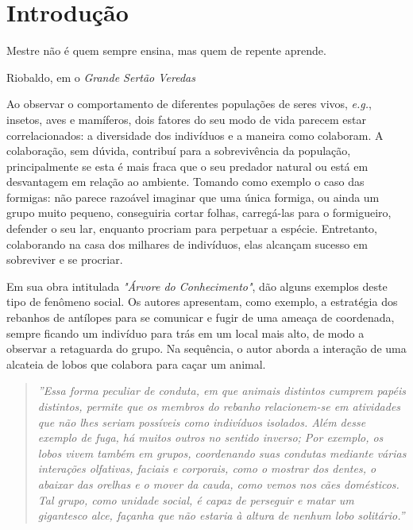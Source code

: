
\chapter{Introdução}
\label{chap:introducao}

\epigraph{Mestre não é quem sempre ensina, mas quem de repente aprende.}{Riobaldo, em o \textit{Grande Sertão Veredas}}

Ao observar o comportamento de diferentes populações de seres vivos, \textit{e.g.}, insetos, aves e mamíferos, dois fatores do seu modo de vida parecem estar correlacionados: a diversidade dos indivíduos e a maneira como colaboram. A colaboração, sem dúvida, contribuí para a sobrevivência da população, principalmente se esta é mais fraca que o seu predador natural ou está em desvantagem em relação ao ambiente. Tomando como exemplo o caso das formigas: não parece razoável imaginar que uma única formiga, ou ainda um grupo muito pequeno, conseguiria cortar folhas, carregá-las para o formigueiro, defender o seu lar, enquanto procriam para perpetuar a espécie. Entretanto, colaborando na casa dos milhares de indivíduos, elas alcançam sucesso em sobreviver e se procriar.

Em sua obra intitulada \textit{"Árvore do Conhecimento"},  dão alguns exemplos deste tipo de  fenômeno social. Os autores apresentam, como exemplo, a estratégia dos rebanhos de antílopes para se comunicar e fugir de uma ameaça de coordenada, sempre ficando um indivíduo para trás em um local mais alto, de modo a observar a retaguarda do grupo. Na sequência, o autor aborda a interação de uma alcateia de lobos que colabora para caçar um animal.

\begin{quote}
\textit{''Essa forma peculiar de conduta, em que animais distintos cumprem papéis distintos, permite que os membros do rebanho relacionem-se em atividades que não lhes seriam possíveis como indivíduos isolados. Além desse exemplo de fuga, há muitos outros no sentido inverso; Por exemplo, os lobos vivem também em grupos, coordenando suas condutas mediante várias interações olfativas, faciais e corporais, como o mostrar dos dentes, o abaixar das orelhas e o mover da cauda, como vemos nos cães domésticos. Tal grupo, como unidade social, é capaz de perseguir e matar um gigantesco alce, façanha que não estaria à altura de nenhum lobo solitário.''} \cite{maturana2001}
\end{quote}

